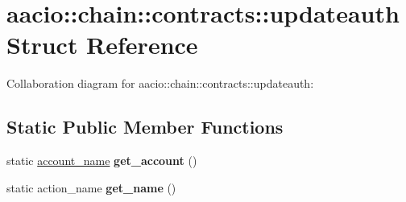 \hypertarget{structaacio_1_1chain_1_1contracts_1_1updateauth}{}\section{aacio\+:\+:chain\+:\+:contracts\+:\+:updateauth Struct Reference}
\label{structaacio_1_1chain_1_1contracts_1_1updateauth}


Collaboration diagram for aacio\+:\+:chain\+:\+:contracts\+:\+:updateauth\+:
\subsection*{Static Public Member Functions}
\begin{DoxyCompactItemize}
\item 
\mbox{\label{structaacio_1_1chain_1_1contracts_1_1updateauth_a48742714e64b656a1023dd85b73a2a67}} 
static \mbox{\hyperlink{structaacio_1_1chain_1_1name}{account\+\_\+name}} {\bfseries get\+\_\+account} ()
\item 
\mbox{\label{structaacio_1_1chain_1_1contracts_1_1updateauth_a37c080abee268c704699a37e1345d67b}} 
static action\+\_\+name {\bfseries get\+\_\+name} ()
\end{DoxyCompactItemize}
